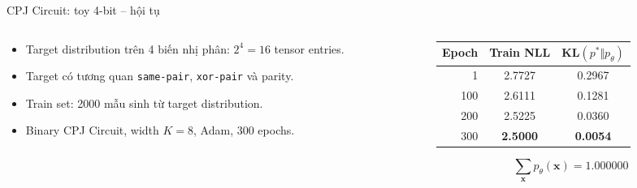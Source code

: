 \begin{frame}{CPJ Circuit: toy 4-bit -- hội tụ}
\begin{columns}[T,totalwidth=\textwidth]
    \begin{column}{0.45\textwidth}
        \begin{itemize}
            \item Target distribution trên 4 biến nhị phân: $2^4=16$ tensor entries.
            \item Target có tương quan \texttt{same-pair}, \texttt{xor-pair} và parity.
            \item Train set: 2000 mẫu sinh từ target distribution.
            \item Binary CPJ Circuit, width $K=8$, Adam, 300 epochs.
        \end{itemize}
    \end{column}
    \begin{column}{0.51\textwidth}
        \centering
        \small
        \renewcommand{\arraystretch}{1.18}
        \begin{tabular}{rcc}
        \toprule
        \textbf{Epoch} & \textbf{Train NLL} & \textbf{KL}$(p^*\Vert p_\theta)$ \\
        \midrule
        1   & 2.7727 & 0.2967 \\
        100 & 2.6111 & 0.1281 \\
        200 & 2.5225 & 0.0360 \\
        300 & \textbf{2.5000} & \textbf{0.0054} \\
        \bottomrule
        \end{tabular}

        \vspace{0.12cm}
        \[
            \sum_{\mathbf{x}}p_\theta(\mathbf{x})=1.000000
        \]
    \end{column}
\end{columns}
\end{frame}

